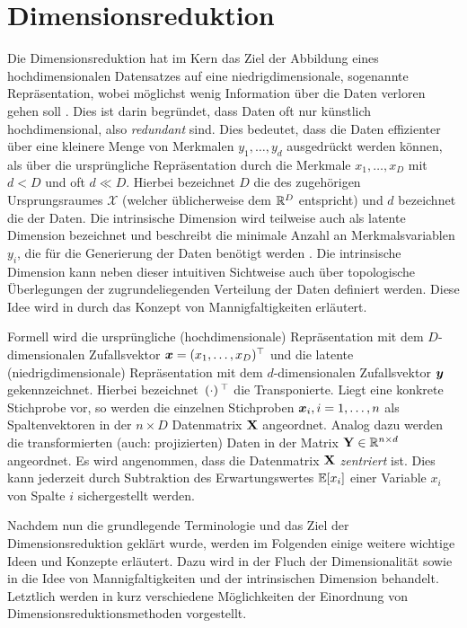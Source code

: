 \chapter{Dimensionsreduktion}
\label{ch:Dimensionsreduktion}

Die Dimensionsreduktion hat im Kern das Ziel der Abbildung eines hochdimensionalen Datensatzes auf
eine niedrigdimensionale, sogenannte  Repräsentation, wobei möglichst wenig
Information über die Daten verloren gehen soll \parencite[2]{Lee.2007}. Dies ist darin begründet, dass Daten oft nur künstlich hochdimensional, also
\textit{redundant} sind. Dies bedeutet, dass die Daten effizienter über eine kleinere Menge von
Merkmalen $y_1,\ldots,y_d$ ausgedrückt werden können, als über die ursprüngliche Repräsentation
durch die Merkmale $x_1,\ldots,x_D$ mit $d < D$ und oft $d \ll D$. Hierbei bezeichnet $D$ die
 des zugehörigen Ursprungsraumes $\mathcal{X}$ (welcher
üblicherweise dem $\mathbb{R}^D$ entspricht) und $d$ bezeichnet die  der
Daten. Die intrinsische Dimension wird teilweise auch als latente Dimension bezeichnet und
beschreibt die minimale Anzahl an Merkmalsvariablen $y_i$, die für die Generierung der Daten
benötigt werden \parencite[47]{Lee.2007}. Die intrinsische Dimension kann neben dieser intuitiven Sichtweise auch über
topologische Überlegungen der zugrundeliegenden Verteilung der Daten definiert werden. Diese Idee
wird in  durch das Konzept von
Mannigfaltigkeiten erläutert.

Formell wird die ursprüngliche (hochdimensionale) Repräsentation mit dem $D$-dimensionalen
Zufallsvektor $\bm{x} = (x_1, \ldots, x_D)^\top$ und die latente (niedrigdimensionale)
Repräsentation mit dem $d$-dimensionalen Zufallsvektor $\bm{y}$ gekennzeichnet. Hierbei
bezeichnet $\,(\cdot)\,^\top$ die Transponierte. Liegt eine konkrete Stichprobe vor, so werden die
einzelnen Stichproben $\bm{x}_i, i = 1,\ldots,n$ als Spaltenvektoren in der $n \times D$
Datenmatrix $\mathbf{X}$ angeordnet. Analog dazu werden die transformierten (auch: projizierten) Daten
in der Matrix $\mathbf{Y} \in \mathbb{R}^{n \times d}$ angeordnet. Es wird angenommen, dass die Datenmatrix
$\mathbf{X}$ \textit{zentriert} ist. Dies kann jederzeit durch Subtraktion des Erwartungswertes
$\operatorname{\mathbb{E}}[x_i]$ einer Variable $x_i$ von Spalte $i$ sichergestellt werden.

Nachdem nun die grundlegende Terminologie und das Ziel der Dimensionsreduktion geklärt wurde,
werden im Folgenden einige weitere wichtige Ideen und Konzepte erläutert. Dazu wird in
 der Fluch der Dimensionalität sowie in
 die Idee von Mannigfaltigkeiten und
der intrinsischen Dimension behandelt. Letztlich werden in 
kurz verschiedene Möglichkeiten der Einordnung von Dimensionsreduktionsmethoden vorgestellt.

